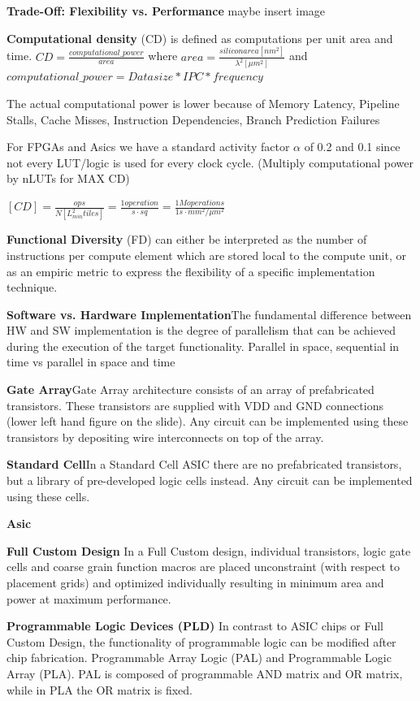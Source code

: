 \documentclass[english]{latex4ei/latex4ei_sheet}
\begin{document}
\textbf{Trade-Off: Flexibility vs. Performance} maybe insert image

\textbf{Computational density} (CD) is defined as computations per unit area and time.
$CD = \frac{computational\_power}{area}$ where $area = \frac{siliconarea [nm^2]}{\lambda^2 [\mu m^2]}$ and $computational\_power = Data size * IPC * frequency$

The actual computational power is lower because of Memory Latency, Pipeline Stalls, Cache Misses, Instruction Dependencies, Branch Prediction Failures

For FPGAs and Asics we have a standard activity factor $\alpha$ of 0.2 and 0.1 since not every LUT/logic is used for every clock cycle. (Multiply computational power by nLUTs for MAX CD)

$[CD] = \frac{ops}{N [L_{min}^2 tiles]} = \frac{1 operation}{s \cdot sq}
	= \frac{1M operations}{1s \cdot mm^2 / \mu m^2}$

\textbf{Functional Diversity} (FD) can either be interpreted as the number of instructions per compute element which are stored local to the compute unit, or as an empiric metric to express the flexibility of a specific implementation technique.

\textbf{Software vs. Hardware Implementation}The fundamental difference between HW and SW implementation is the degree of parallelism that can be achieved during the execution of the target functionality. Parallel in space, sequential in time vs parallel in space and time

\textbf{Gate Array}Gate Array architecture consists of an array of prefabricated transistors. These transistors are supplied with VDD and GND connections (lower left hand figure on the slide). Any circuit can be implemented using these transistors by depositing wire interconnects on top of the array.

\textbf{Standard Cell}In a Standard Cell ASIC there are no prefabricated transistors, but a library of pre-developed logic cells instead. Any circuit can be implemented using these cells.

\textbf{Asic}

\textbf{Full Custom Design}
In a Full Custom design, individual transistors, logic gate cells and coarse grain function macros are placed unconstraint (with respect to placement grids) and optimized individually resulting in minimum area and power at maximum performance.

\textbf{Programmable Logic Devices (PLD)}
In contrast to ASIC chips or Full Custom Design, the functionality of programmable logic can be modified after chip fabrication.
Programmable Array Logic (PAL) and Programmable Logic Array (PLA). PAL is composed of programmable AND matrix and OR matrix, while in PLA the OR matrix is fixed.
\end{document}
